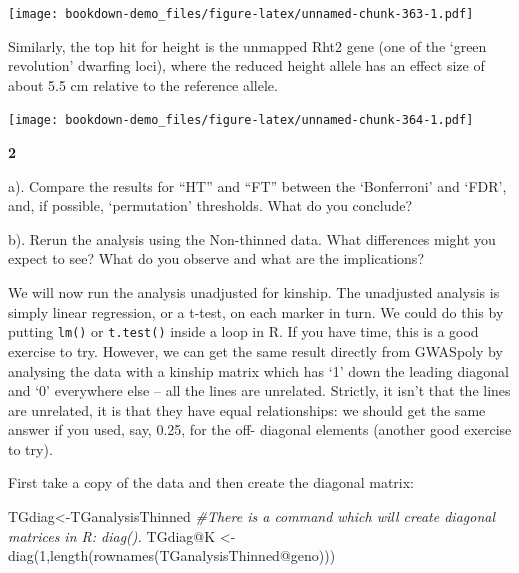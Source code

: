 \documentclass[
]{book}
\makeatletter
\newenvironment{Shaded}{\begin{snugshade}}{\end{snugshade}}
\newcommand{\AttributeTok}[1]{\textcolor[rgb]{0.77,0.63,0.00}{#1}}
\newcommand{\CommentTok}[1]{\textcolor[rgb]{0.56,0.35,0.01}{\textit{#1}}}
\newcommand{\DecValTok}[1]{\textcolor[rgb]{0.00,0.00,0.81}{#1}}
\newcommand{\FunctionTok}[1]{\textcolor[rgb]{0.00,0.00,0.00}{#1}}
\newcommand{\NormalTok}[1]{#1}
\newcommand{\OtherTok}[1]{\textcolor[rgb]{0.56,0.35,0.01}{#1}}
\newcommand{\SpecialCharTok}[1]{\textcolor[rgb]{0.00,0.00,0.00}{#1}}
\newenvironment{kframe}{%
\medskip{}
\setlength{\fboxsep}{.8em}
 \def\at@end@of@kframe{}%
 \ifinner\ifhmode%
  \def\at@end@of@kframe{\end{minipage}}%
  \begin{minipage}{\columnwidth}%
 \fi\fi%
 \def\FrameCommand##1{\hskip\@totalleftmargin \hskip-\fboxsep
 \colorbox{shadecolor}{##1}\hskip-\fboxsep
     \hskip-\linewidth \hskip-\@totalleftmargin \hskip\columnwidth}%
 \MakeFramed {\advance\hsize-\width
   \@totalleftmargin\z@ \linewidth\hsize
   \@setminipage}}%
 {\par\unskip\endMakeFramed%
 \at@end@of@kframe}
\newenvironment{rmdblock}[1]
  {
  \begin{itemize}
  \renewcommand{\labelitemi}{
    \raisebox{-.7\height}[0pt][0pt]{
      {\setkeys{Gin}{width=3em,keepaspectratio}\texttt{[image: images/\#1]}}
    }
  }
  \setlength{\fboxsep}{1em}
  \begin{kframe}
  \item
  }
  {
  \end{kframe}
  \end{itemize}
  }
\newenvironment{rmdquiz}
  {\begin{rmdblock}{quiz}}
  {\end{rmdblock}}
\makeatother
\begin{document}
\texttt{[image: bookdown-demo\_files/figure-latex/unnamed-chunk-363-1.pdf]}

Similarly, the top hit for height is the unmapped Rht2 gene (one of the `green revolution' dwarfing loci), where the reduced height allele has an effect size of about 5.5 cm relative to the reference allele.

\begin{Shaded}
\end{Shaded}

\texttt{[image: bookdown-demo\_files/figure-latex/unnamed-chunk-364-1.pdf]}

\begin{rmdquiz}
\textbf{2}

a). Compare the results for ``HT'' and ``FT'' between the `Bonferroni' and `FDR', and, if possible, `permutation' thresholds. What do you conclude?

b). Rerun the analysis using the Non-thinned data. What differences might you expect to see? What do you observe and what are the implications?
\end{rmdquiz}

We will now run the analysis unadjusted for kinship. The unadjusted analysis is simply linear regression, or a t-test, on each marker in turn. We could do this by putting \texttt{lm()} or \texttt{t.test()} inside a loop in R. If you have time, this is a good exercise to try. However, we can get the same result directly from GWASpoly by analysing the data with a kinship matrix which has `1' down the leading diagonal and `0' everywhere else -- all the lines are unrelated. Strictly, it isn't that the lines are unrelated, it is that they have equal relationships: we should get the same answer if you used, say, 0.25, for the off- diagonal elements (another good exercise to try).

First take a copy of the data and then create the diagonal matrix:

\begin{Shaded}
\begin{Highlighting}[]
\NormalTok{TGdiag}\OtherTok{\textless{}{-}}\NormalTok{TGanalysisThinned}
\CommentTok{\#There is a command which will create diagonal matrices in R: diag().  }
\NormalTok{TGdiag}\SpecialCharTok{@}\NormalTok{K }\OtherTok{\textless{}{-}} \FunctionTok{diag}\NormalTok{(}\DecValTok{1}\NormalTok{,}\FunctionTok{length}\NormalTok{(}\FunctionTok{rownames}\NormalTok{(TGanalysisThinned}\SpecialCharTok{@}\NormalTok{geno)))}
\end{Highlighting}
\end{Shaded}
\end{document}
